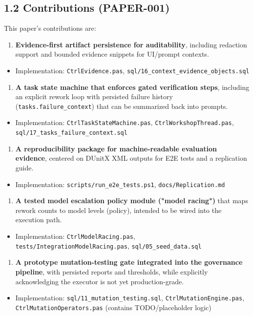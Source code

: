\documentclass[11pt]{article}
\begin{document}
\subsection{1.2 Contributions (PAPER-001)}
This paper’s contributions are:
\begin{enumerate}
\item \textbf{Evidence-first artifact persistence for auditability}, including redaction support and bounded evidence snippets for UI/prompt contexts.
\end{enumerate}
\begin{itemize}
\item Implementation: \texttt{CtrlEvidence.pas}, \texttt{sql/16\_context\_evidence\_objects.sql}
\end{itemize}
\begin{enumerate}
\item \textbf{A task state machine that enforces gated verification steps}, including an explicit rework loop with persisted failure history (\texttt{tasks.failure\_context}) that can be summarized back into prompts.
\end{enumerate}
\begin{itemize}
\item Implementation: \texttt{CtrlTaskStateMachine.pas}, \texttt{CtrlWorkshopThread.pas}, \texttt{sql/17\_tasks\_failure\_context.sql}
\end{itemize}
\begin{enumerate}
\item \textbf{A reproducibility package for machine-readable evaluation evidence}, centered on DUnitX XML outputs for E2E tests and a replication guide.
\end{enumerate}
\begin{itemize}
\item Implementation: \texttt{scripts/run\_e2e\_tests.ps1}, \texttt{docs/Replication.md}
\end{itemize}
\begin{enumerate}
\item \textbf{A tested model escalation policy module ("model racing")} that maps rework counts to model levels (policy), intended to be wired into the execution path.
\end{enumerate}
\begin{itemize}
\item Implementation: \texttt{CtrlModelRacing.pas}, \texttt{tests/IntegrationModelRacing.pas}, \texttt{sql/05\_seed\_data.sql}
\end{itemize}
\begin{enumerate}
\item \textbf{A prototype mutation-testing gate integrated into the governance pipeline}, with persisted reports and thresholds, while explicitly acknowledging the executor is not yet production-grade.
\end{enumerate}
\begin{itemize}
\item Implementation: \texttt{sql/11\_mutation\_testing.sql}, \texttt{CtrlMutationEngine.pas}, \texttt{CtrlMutationOperators.pas} (contains TODO/placeholder logic)
\end{itemize}
\end{document}
